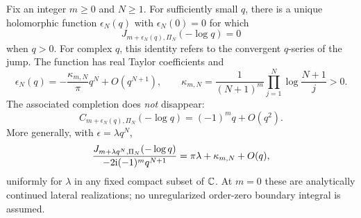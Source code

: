 \begin{theorem}
\label{ojf:thm:neutral}
Fix an integer $m\ge0$ and $N\ge1$. For sufficiently small $q$, there
is a unique holomorphic function $\epsilon_N(q)$ with
$\epsilon_N(0)=0$ for which
\begin{equation}\label{ojf:eq:neutral-identity}
 J_{m+\epsilon_N(q),\Pi_N}(-\log q)=0
\end{equation}
when $q>0$. For complex $q$, this identity refers to the convergent
$q$-series of the jump. The function has real Taylor coefficients and
\begin{equation}\label{ojf:eq:neutral-leading}
 \epsilon_N(q)=-\frac{\kappa_{m,N}}\pi q^N+O(q^{N+1}),\qquad
 \kappa_{m,N}=\frac1{(N+1)^m}
                 \prod_{j=1}^N\log\frac{N+1}{j}>0.
\end{equation}
The associated completion does \emph{not} disappear:
\begin{equation}\label{ojf:eq:neutral-completion}
 C_{m+\epsilon_N(q),\Pi_N}(-\log q)
                  =(-1)^m q+O(q^2).
\end{equation}
More generally, with $\epsilon=\lambda q^N$,
\begin{equation}\label{ojf:eq:crossover}
 \frac{J_{m+\lambda q^N,\Pi_N}(-\log q)}
                   {-2\mathrm{i}(-1)^m q^{N+1}}
       =\pi\lambda+\kappa_{m,N}+O(q),
\end{equation}
uniformly for $\lambda$ in any fixed compact subset of $\mathbb C$.
At $m=0$ these are analytically continued lateral realizations; no
unregularized order-zero boundary integral is assumed.
\end{theorem}

